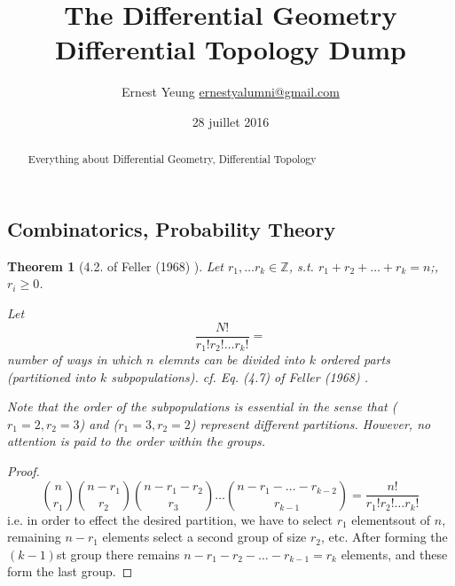 \documentclass[10pt]{amsart}
\title{The Differential Geometry Differential Topology Dump}
\author{Ernest Yeung \href{mailto:ernestyalumni@gmail.com}{ernestyalumni@gmail.com}}
\date{28 juillet 2016}
\newtheorem{theorem}{Theorem}
\begin{document}

\maketitle



\begin{multicols*}{2}

  
\setcounter{tocdepth}{1}
\tableofcontents



\begin{abstract}
Everything about Differential Geometry, Differential Topology

\end{abstract}

\part{Combinatorics, Probability Theory}

\begin{theorem}[4.2. of Feller (1968)  \cite{Fell1968}]
	Let $r_1,\dots r_k \in \mathbb{Z}$, s.t. $r_1 + r_2 + \dots + r_k = n$;, $r_i \geq 0$.  

Let 
\begin{equation}
\frac{ N! }{r_1! r_2! \dots r_k!} = 
\end{equation}
number of ways in which $n$ elemnts can be divided into $k$ ordered parts (partitioned into $k$ subpopulations).  cf. Eq. (4.7) of Feller (1968)  \cite{Fell1968}.  

Note that the order of the subpopulations is essential in the sense that ($r_1 = 2,r_2 =3$) and ($r_1=3,r_2=2$) represent different partitions.  However, no attention is paid to the order within the groups.  

\end{theorem}
\begin{proof}
\begin{equation}
\binom{n}{r_1} \binom{n-r_1}{r_2} \binom{n-r_1-r_2}{r_3} \dots \binom{n-r_1-\dots - r_{k-2} }{ r_{k-1} } = \frac{n!}{ r_1! r_2! \dots r_k! }
\end{equation}
i.e. in order to effect the desired partition, we have to select $r_1$ elementsout of $n$, remaining $n-r_1$ elements select a second group of size $r_2$, etc.  After forming the $(k-1)$st group there remains $n-r_1 -r_2 - \dots - r_{k-1} = r_k$ elements, and these form the last group.  
\end{proof}


\end{multicols*}
\end{document}
